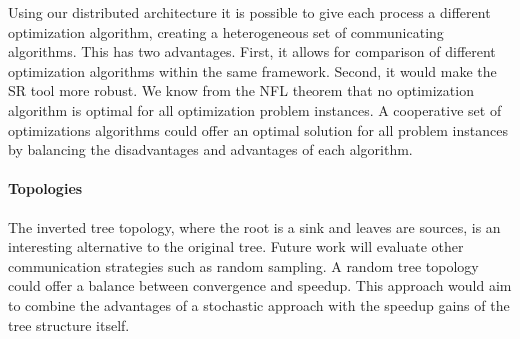 Using our distributed architecture it is possible to give each process a different optimization algorithm, creating a heterogeneous set of communicating algorithms. This has two advantages. First, it allows for comparison of different optimization algorithms within the same framework. Second, it would make the SR tool more robust. We know from the NFL theorem that no optimization algorithm is optimal for all optimization problem instances. A cooperative set of optimizations algorithms could offer an optimal solution for all problem instances by balancing the disadvantages and advantages of each algorithm. 



\paragraph{Topologies}
The inverted tree topology, where the root is a sink and leaves are sources, is an interesting alternative to the original tree. Future work will evaluate other communication strategies such as random sampling. A random tree topology could offer a balance between convergence and speedup. This approach would aim to combine the advantages of a stochastic approach with the speedup gains of the tree structure itself. 

